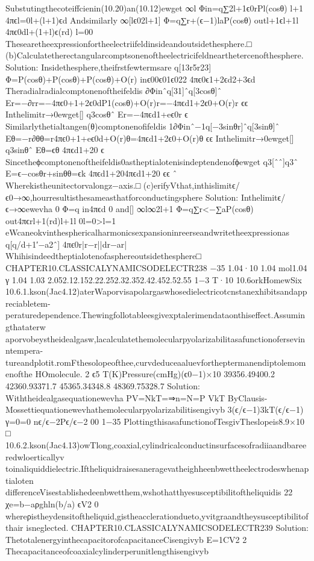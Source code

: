 {{{{{{{{{{{{{{{Substutingthecoteiffcienin(10.20)an(10.12)ewget
∞l
Φin=q∑2l+1ϵ0rPl(cosθ)
l+1
4πϵl=0l+(l+1)ϵd
Andsimilarly
∞[lϵ02l+1]
Φ=q∑r+(ϵ−1)laP(cosθ)
outl+1ϵl+1l
4πϵ0dl+(1+l)ϵ(rd)
l=00
Thesearetheexpressionfortheelectriifeldinsideandoutsidethesphere.□
(b)Calculatetherectangularcomptsonenoftheelectricifeldnearthetercenofthesphere.
Solution:
Insidethesphere,theifrstfewtermsare
q[13r5r23]
Φ=P(cosθ)+P(cosθ)+P(cosθ)+O(r)
inϵ00ϵ01ϵ022
4πϵ0ϵ1+2ϵd2+3ϵd
Theradialradialcomptonenoftheifeldis
∂Φinˆq[31]ˆq[3cosθ]ˆ
Er=−∂rr=−4πϵ0+1+2ϵ0dP1(cosθ)+O(r)r=−4πϵd1+2ϵ0+O(r)r
ϵϵ
Inthelimitr→0ewget[]
q3cosθˆ
Er=−4πϵd1+eϵ0r
ϵ
Similarlythetialtangen(θ)comptonenofifeldis
1∂Φinˆ−1q[−3sinθr]ˆq[3sinθ]ˆ
Eθ=−r∂θθ=r4πϵ0+1+eϵ0d+O(r)θ=4πϵd1+2ϵ0+O(r)θ
ϵϵ
Inthelimitr→0ewget[]
q3sinθˆ
Eθ=ϵθ
4πϵd1+20
ϵ
Sincetheϕcomptonenoftheifeldis0astheptialotenisindeptendenofϕewget
q3[ˆˆ]q3ˆ
E=ϵ−cosθr+sinθθ=ϵk
4πϵd1+204πϵd1+20
ϵϵ
ˆ
Wherekistheunitectorvalongz−axis.□
(c)erifyVthat,inthislimitϵ/ϵ0→∞,hourresultisthesameasthatforconductingsphere
Solution:
Inthelimitϵ/ϵ→∞ewevha
0
Φ=q
in4πϵd
0
and[]
∞l∞2l+1
Φ=q∑r<−∑aP(cosθ)
out4πϵrl+1(rd)l+1l
0l=0>l=1
eWcaneokvinthesphericalharmonicsexpansioninreerseandwritetheexpressionas
q[q/d+1′−a2ˆ]
4πϵ0r|r−r||dr−ar|
Whihisindeedtheptialotenofasphereoutsidethesphere□
CHAPTER10.CLASSICALYNAMICSODELECTR238
−35
1.04·10
1.04
mol1.04
γ
1.04
1.03
2.052.12.152.22.252.32.352.42.452.52.55
1−3
T·10
10.6orkHomewSix
10.6.1.kson(Jac4.12)aterWaporvisapolargaswhosedielectricotcnstanexhibitsandappreciabletem-
peraturedependence.Thewingfollotableesgivexptalerimendataonthiseffect.Assumingthataterw
aporvobeystheidealgasw,lacalculatethemolecularpyolarizabilitasafunctionofersevinntempera-
tureandplotit.romFthesolopeofthee,curvdeduceaaluevfortheptermanendiptolemomenofthe
HOmolecule.
2
ϵ5
T(K)Pressure(cmHg)(ϵ0−1)×10
39356.49400.2
42360.93371.7
45365.34348.8
48369.75328.7
Solution:
Withtheidealgasequationewevha
PV=NkT=⇒n=N=P
VkT
ByClausis-Mossettiequationewevhathemolecularpyolarizabilitisengivyb
3(ϵ/ϵ−1)3kT(ϵ/ϵ−1)
γ=0=0
nϵ/ϵ−2Pϵ/ϵ−2
00
1−35
PlottingthisasafunctionofTesgivTheslopeis8.9×10
□
10.6.2.kson(Jac4.13)owTlong,coaxial,cylindricalconductinsurfacesofradiiaandbareeredwloerticallyv
toinaliquiddielectric.Iftheliquidraisesaneragevatheighheenbwettheelectrodeswhenaptialoten
differenceVisestablishedeenbwetthem,wshothatthyesusceptibilitoftheliquidis
22
χe=b−aρghln(b/a)
ϵV2
0
whereρistheydensitoftheliquid,gistheacclerationdueto,yvitgraandtheysusceptibilitofthair
isneglected.
CHAPTER10.CLASSICALYNAMICSODELECTR239
Solution:
ThetotalenergyinthecapacitorofcapacitanceCisengivyb
E=1CV2
2
Thecapacitanceofcoaxialcylinderperunitlengthisengivyb
}}}}}}}}}}}}}}}
